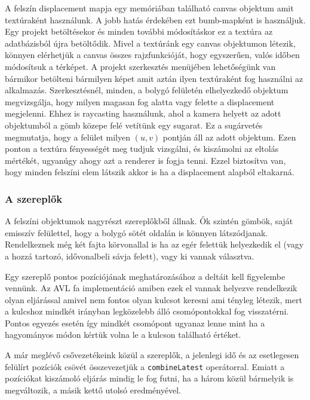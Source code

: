 A felszín displacement mapja egy memóriában található canvas objektum amit textúraként használunk. A jobb hatás érdekében ezt bumb-mapként \cite{Bump} is használjuk. Egy projekt betöltésekor és minden további módosításkor ez a textúra az adatbázisból újra betöltődik. Mivel a textúránk egy canvas objektumon létezik, könnyen elérhetjük a canvas összes rajzfunkcióját, hogy egyszerűen, valós időben módosítsuk a térképet. A projekt szerkesztés menüjében lehetőségünk van bármikor betölteni bármilyen képet amit aztán ilyen textúraként fog használni az alkalmazás. Szerkesztésnél, minden, a bolygó felületén elhelyezkedő objektum megvizsgálja, hogy milyen magasan fog alatta vagy felette a displacement megjelenni. Ehhez is raycasting használunk, ahol a kamera helyett az adott objektumból a gömb közepe felé vetítünk egy sugarat. Ez a sugárvetés megmutatja, hogy a felület milyen $(u, v)$ pontján áll az adott objektum. Ezen ponton a textúra fényességét meg tudjuk vizsgálni, és kiszámolni az eltolás mértékét, ugyanúgy ahogy azt a renderer is fogja tenni. Ezzel biztosítva van, hogy minden felszíni elem látszik akkor is ha a displacement alapból eltakarná.

\subsubsection{A szereplők}

A felszíni objektumok nagyrészt szereplőkből állnak. Ők szintén gömbök, saját emisszív felülettel, hogy a bolygó sötét oldalán is könnyen látszódjanak. Rendelkeznek még két fajta körvonallal is ha az egér felettük helyezkedik el (vagy a hozzá tartozó, idővonalbeli sávja felett), vagy ki vannak választva.

Egy szereplő pontos pozíciójának meghatározásához a deltáit kell figyelembe vennünk. Az AVL fa implementáció amiben ezek el vannak helyezve rendelkezik olyan eljárással amivel nem fontos olyan kulcsot keresni ami tényleg létezik, mert a kulcshoz mindkét irányban legközelebb álló csomópontokkal fog visszatérni. Pontos egyezés esetén így mindkét csomópont ugyanaz lenne mint ha a hagyományos módon kértük volna le a kulcson található értéket.

A már meglévő csővezetékeink közül a szereplők, a jelenlegi idő és az esetlegesen felülírt pozíciók csövét összevezetjük a \lstinline[columns=fixed]{combineLatest} operátorral. Emiatt a pozíciókat kiszámoló eljárás mindig le fog futni, ha a három közül bármelyik is megváltozik, a másik kettő utolsó eredményével.


